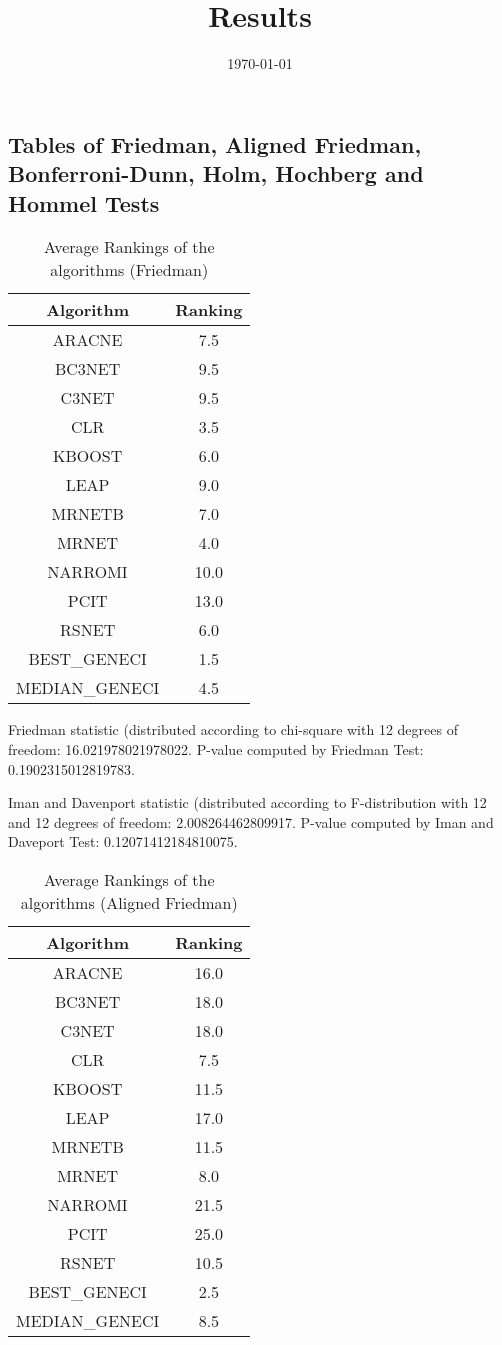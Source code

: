 \documentclass[a4paper,10pt]{article}
\title{Results}
\author{}
\date{\today}
\begin{document}
\begin{landscape}
\oddsidemargin 0in \topmargin 0in\maketitle
\section{Tables of Friedman, Aligned Friedman, Bonferroni-Dunn, Holm, Hochberg and Hommel Tests}
\begin{table}[!htp]
\centering
\caption{Average Rankings of the algorithms (Friedman)
}\begin{tabular}{c|c}
Algorithm&Ranking\\
\hline
ARACNE&7.5\\
BC3NET&9.5\\
C3NET&9.5\\
CLR&3.5\\
KBOOST&6.0\\
LEAP&9.0\\
MRNETB&7.0\\
MRNET&4.0\\
NARROMI&10.0\\
PCIT&13.0\\
RSNET&6.0\\
BEST_GENECI&1.5\\
MEDIAN_GENECI&4.5\\
\end{tabular}
\end{table}


Friedman statistic (distributed according to chi-square with 12 degrees of freedom: 16.021978021978022. 
P-value computed by Friedman Test: 0.1902315012819783.\newline

Iman and Davenport statistic (distributed according to F-distribution with 12 and 12 degrees of freedom: 2.008264462809917. 
P-value computed by Iman and Daveport Test: 0.12071412184810075.\newline


\newpage

\begin{table}[!htp]
\centering
\caption{Average Rankings of the algorithms (Aligned Friedman)
}\begin{tabular}{c|c}
Algorithm&Ranking\\
\hline
ARACNE&16.0\\
BC3NET&18.0\\
C3NET&18.0\\
CLR&7.5\\
KBOOST&11.5\\
LEAP&17.0\\
MRNETB&11.5\\
MRNET&8.0\\
NARROMI&21.5\\
PCIT&25.0\\
RSNET&10.5\\
BEST_GENECI&2.5\\
MEDIAN_GENECI&8.5\\
\end{tabular}
\end{table}



\end{landscape}
\end{document}
